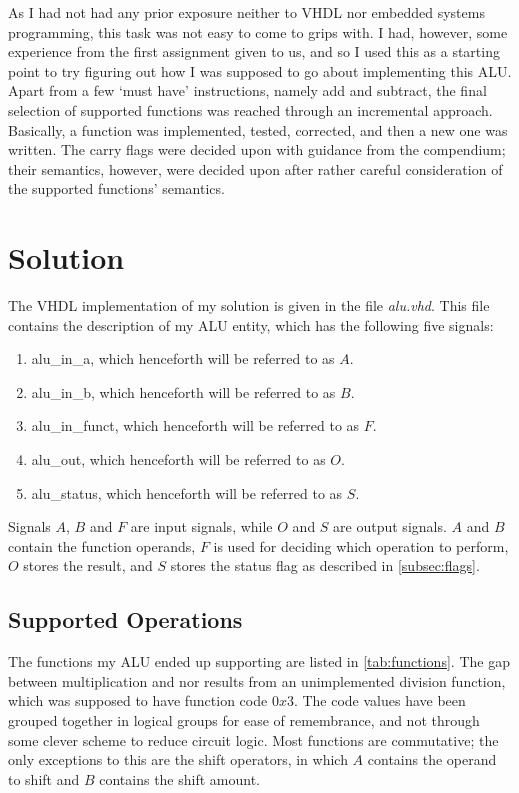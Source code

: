 \documentclass{article}
\begin{document}
As I had not had any prior exposure neither to VHDL nor embedded systems programming, this task was not easy to come to grips with. I had, however, some experience from the first assignment given to us, and so I used this as a starting point to try figuring out how I was supposed to go about implementing this ALU. Apart from a few `must have' instructions, namely add and subtract, the final selection of supported functions was reached through an incremental approach. Basically, a function was implemented, tested, corrected, and then a new one was written. The carry flags were decided upon with guidance from the compendium; their semantics, however, were decided upon after rather careful consideration of the supported functions' semantics. 

\section{Solution}
\label{sec:solution}
The VHDL implementation of my solution is given in the file \emph{alu.vhd}. This file contains the description of my ALU entity, which has the following five signals:

\begin{enumerate} 
\item alu\_in\_a, which henceforth will be referred to as $A$.
\item alu\_in\_b, which henceforth will be referred to as $B$.
\item alu\_in\_funct, which henceforth will be referred to as $F$.
\item alu\_out, which henceforth will be referred to as $O$.
\item alu\_status, which henceforth will be referred to as $S$.
\end{enumerate}

Signals $A$, $B$ and $F$ are input signals, while $O$ and $S$ are output signals. $A$ and $B$ contain the function operands, $F$ is used for deciding which operation to perform, $O$ stores the result, and $S$ stores the status flag as described in \autoref{subsec:flags}.

\subsection{Supported Operations}
\label{subsec:ops}
The functions my ALU ended up supporting are listed in \autoref{tab:functions}. The gap between multiplication and nor results from an unimplemented division function, which was supposed to have function code $0x3$. The code values have been grouped together in logical groups for ease of remembrance, and not through some clever scheme to reduce circuit logic. Most functions are commutative; the only exceptions to this are the shift operators, in which $A$ contains the operand to shift and $B$ contains the shift amount.
\end{document}
